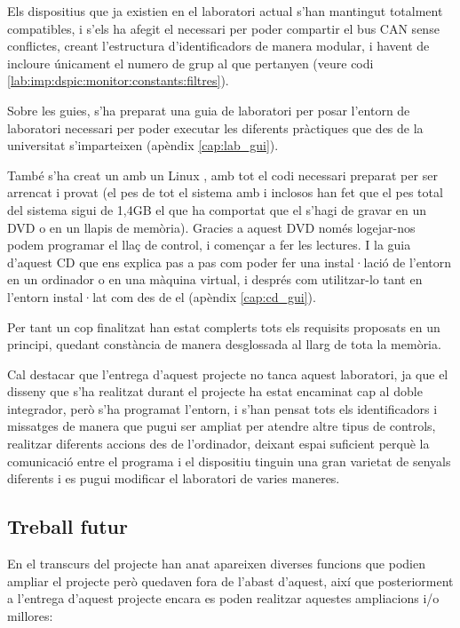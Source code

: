 Els dispositius que ja existien en el laboratori actual s'han mantingut totalment compatibles, i s'els ha afegit el necessari per poder compartir el bus CAN sense conflictes, creant l'estructura d'identificadors de manera modular, i havent de incloure únicament el numero de grup al que pertanyen (veure codi \ref{lab:imp:dspic:monitor:constants:filtres}).

Sobre les guies, s'ha preparat una guia de laboratori per posar l'entorn de laboratori necessari per poder executar les diferents pràctiques que des de la universitat s'imparteixen (apèndix \ref{cap:lab_gui}).

També s'ha creat un \LiveCD amb un Linux \Ubuntu, amb tot el codi necessari preparat per ser arrencat i provat (el pes de tot el sistema amb \Eclipse i \MplabX inclosos han fet que el pes total del sistema sigui de 1,4GB el que ha comportat que el \LiveCD s'hagi de gravar en un DVD o en un llapis de memòria). Gracies a aquest DVD només logejar-nos podem programar el llaç de control, i començar a fer les lectures. I la guia d'aquest CD que ens explica pas a pas com poder fer una instal·lació de l'entorn en un ordinador o en una màquina virtual, i després com utilitzar-lo tant en l'entorn instal·lat com des de el \LiveCD (apèndix \ref{cap:cd_gui}).

Per tant un cop finalitzat han estat complerts tots els requisits proposats en un principi, quedant constància de manera desglossada al llarg de tota la memòria. 

Cal destacar que l'entrega d'aquest projecte no tanca aquest laboratori, ja que el disseny que s'ha realitzat durant el projecte ha estat encaminat cap al doble integrador, però s'ha programat l'entorn, i s'han pensat tots els identificadors i missatges de manera que pugui ser ampliat per atendre altre tipus de controls, realitzar diferents accions des de l'ordinador, deixant espai suficient perquè la comunicació entre el programa \DCSMonitor i el dispositiu \Monitor tinguin una gran varietat de senyals diferents i es pugui modificar el laboratori de varies maneres.
 
\subsection{Treball futur}

En el transcurs del projecte han anat apareixen diverses funcions que podien ampliar el projecte però quedaven fora de l'abast d'aquest, així que posteriorment a l'entrega d'aquest projecte encara es poden realitzar aquestes ampliacions i/o millores:


